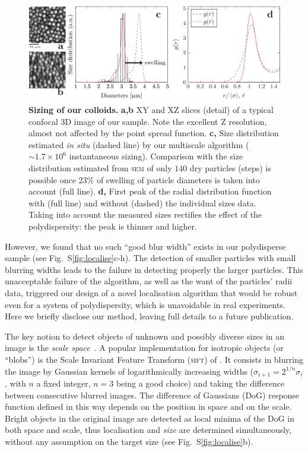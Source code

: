 \documentclass[prl,twocolumn,notitlepage]{revtex4-1}
\begin{document}
\begin{figure}
\begin{center}
\includegraphics{generate_figures-figure6.pdf}
\end{center}
	\caption{\textbf{Sizing of our colloids.} \textbf{a,b} XY and XZ slices (detail) of a typical confocal 3D image of our sample. Note the excellent Z resolution, almost not affected by the point spread function. \textbf{c,} Size distribution estimated \emph{in situ} (dashed line) by our multiscale algorithm ($\sim 1.7\times 10^6$ instantaneous sizing). Comparison with the size distribution estimated from \textsc{sem} of only $140$ dry particles (steps) is possible once $23\%$ of swelling of particle diameters is taken into account (full line). \textbf{d,} First peak of the radial distribution function with (full line) and without (dashed) the individual sizes data. Taking into account the measured sizes rectifies the effect of the polydispersity: the peak is thinner and higher.}
	\label{fig:sizing}
\end{figure}

However, we found that no such ``good blur width'' exists in our polydisperse sample (see Fig.~S\ref{fig:localise}c-h). The detection of smaller particles with small blurring widths leads to the failure in detecting properly the larger particles. This unacceptable failure of the \citet{Crocker1996} algorithm, as well as the want of the particles' radii data, triggered our design of a novel localisation algorithm that would be robust even for a system of polydispersity, which is unavoidable in real experiments. Here we briefly disclose our method, leaving full details to a future publication.

The key notion to detect objects of unknown and possibly diverse sizes in an image is the \emph{scale space}~\cite{Lindeberg1993}. A popular implementation for isotropic objects (or ``blobs'') is the Scale Invariant Feature Transform (\textsc{sift}) of \citet{Lowe2004}. It consists  in blurring the image by Gaussian kernels of logarithmically increasing widths ($\sigma_{i+1} = 2^{1/n} \sigma_i$, with $n$ a fixed integer, $n=3$ being a good choice) and taking the difference between consecutive blurred images. The difference of Gaussians (DoG) response function defined in this way depends on the position in space and on the scale. Bright objects in the original image are detected as local minima of the DoG in both space and scale, thus localisation and \emph{size} are determined simultaneously, without any assumption on the target size (see Fig.~S\ref{fig:localise}b).
\end{document}
